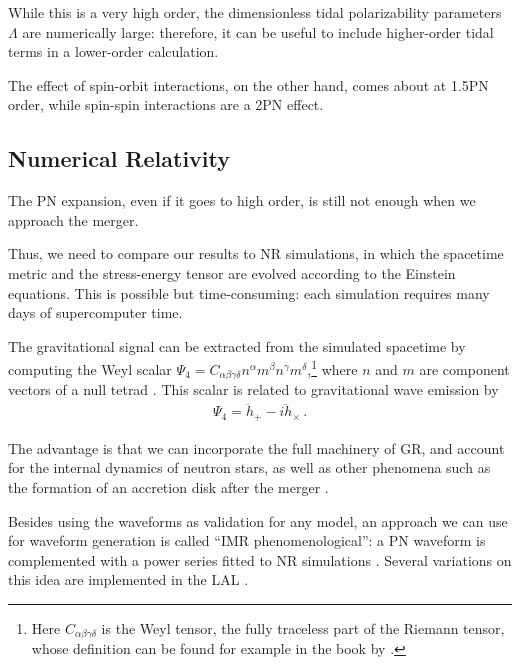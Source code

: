 \documentclass[main.tex]{subfiles}
\begin{document}
While this is a very high order, the dimensionless tidal polarizability parameters \(\Lambda \) are numerically large: therefore, it can be useful to include higher-order tidal terms in a lower-order calculation. 

The effect of spin-orbit interactions, on the other hand, comes about at 1.5PN order, while spin-spin interactions are a 2PN effect.

\subsection{Numerical Relativity} \label{sec:nr}

The \ac{PN} expansion, even if it goes to high order, is still not enough when we approach the merger. 

Thus, we need to compare our results to \ac{NR} simulations, in which the spacetime metric and the stress-energy tensor are evolved according to the Einstein equations. 
This is possible but time-consuming: each simulation requires many days of supercomputer time. 

The gravitational signal can be extracted from the simulated spacetime by computing the Weyl scalar \(\Psi_{4} = C_{\alpha \beta \gamma \delta }n^\alpha m^\beta n^\gamma m^\delta \),\footnote{Here \(C_{\alpha \beta \gamma \delta }\) is the Weyl tensor, the fully traceless part of the Riemann tensor, whose definition can be found for example in the book by \textcite[eq.\ 2.18]{gourgoulhonFormalismBasesNumerical2007}.} where \(n\) and \(m\) are component vectors of a null tetrad \cite[sec.\ 5.6.3]{lofflerEinsteinToolkitCommunity2012}. This scalar is related to gravitational wave emission by 
%
\begin{align}
\Psi_{4} = \ddot{h}_+ - i \ddot{h}_{\times }
\,.
\end{align}


The advantage is that we can incorporate the full machinery of \ac{GR}, and account for the internal dynamics of neutron stars, as well as other phenomena such as the formation of an accretion disk after the merger \cite{nedoraNumericalRelativitySimulations2020}.

Besides using the waveforms as validation for any model, 
an approach we can use for waveform generation is called ``\ac{IMR} phenomenological'': a \ac{PN} waveform is complemented with a power series fitted to \ac{NR} simulations \cite{kumarAccuracyPrecisionGravitationalwave2015}. 
Several variations on this idea are implemented in the \ac{LAL} \cite[]{ligoscientificcollaborationLIGOAlgorithmLibrary2018}.
\end{document}
